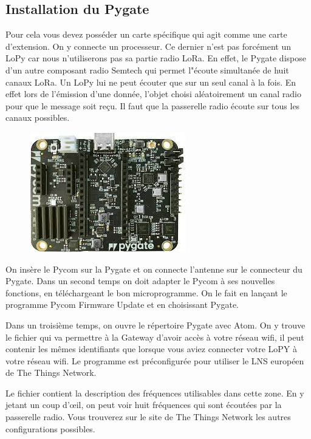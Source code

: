 \subsection{Installation du Pygate}


Pour cela vous devez posséder un carte spécifique qui agit comme une carte d'extension. On y connecte un processeur. Ce dernier n'est pas forcément un LoPy car nous n'utiliserons pas sa partie radio LoRa. En effet, le Pygate dispose d'un autre composant radio Semtech qui permet l"écoute simultanée de huit canaux LoRa. Un LoPy lui ne peut écouter que sur un seul canal à la fois. En effet lors de l'émission d'une donnée, l'objet choisi aléatoirement un canal radio pour que le message soit reçu. Il faut que la passerelle radio écoute sur tous les canaux possibles.

         \vspace{1em}

\begin{figure}
\centerline{\includegraphics[width=.4\columnwidth]{Pictures/pygate.png}}
\end{figure}

On insère le Pycom sur la Pygate et on connecte l'antenne sur le connecteur du Pygate. Dans un second temps on doit adapter le Pycom à ses nouvelles fonctions, en téléchargeant le bon microprogramme. On le fait en lançant le programme Pycom Firmware Update et en choisissant Pygate. 

         \vspace{1em}


Dans un troisième temps, on ouvre le répertoire Pygate avec Atom. On y trouve le fichier  qui va permettre à la Gateway d'avoir accès à votre réseau wifi, il peut contenir les mêmes identifiants que lorsque vous aviez connecter votre LoPY à votre réseau wifi. Le programme  est préconfigurée pour utiliser le LNS européen de The Things Network. 

         \vspace{1em}

Le fichier  contient la description des fréquences utilisables dans cette zone. En y jetant un coup d'œil, on peut voir huit fréquences qui sont écoutées par la passerelle radio. Vous trouverez sur le site de The Things Network les autres configurations possibles. 

